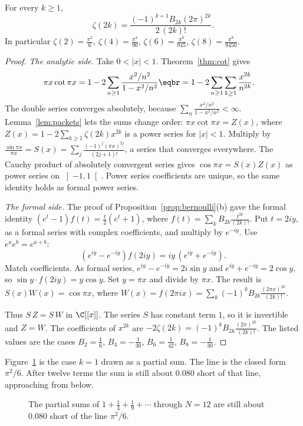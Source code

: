 \begin{theorem}[Euler, 1735--1740]\label{thm:zeta2k}
For every $k\ge1$,
\[
\zeta(2k)=\frac{(-1)^{k+1}B_{2k}(2\pi)^{2k}}{2\,(2k)!}.
\]
In particular $\zeta(2)=\frac{\pi^2}6$, $\zeta(4)=\frac{\pi^4}{90}$, $\zeta(6)=\frac{\pi^6}{945}$, $\zeta(8)=\frac{\pi^8}{9450}$.
\end{theorem}
\begin{proof}
\emph{The analytic side.} Take $0<|x|<1$. Theorem~\ref{thm:cot} gives
\[
\begin{aligned}\pi x\cot\pi x&=1-2\sum_{n\ge1}\frac{x^2/n^2}{1-x^2/n^2}\eqbr=1-2\sum_{n\ge1}\sum_{k\ge1}\frac{x^{2k}}{n^{2k}}.\end{aligned}
\]
The double series converges absolutely, because $\sum_n\frac{x^2/n^2}{1-x^2/n^2}<\infty$. Lemma~\ref{lem:packets} lets the sums change order: $\pi x\cot\pi x=Z(x)$, where $Z(x)=1-2\sum_{k\ge1}\zeta(2k)x^{2k}$ is a power series for $|x|<1$. Multiply by $\frac{\sin\pi x}{\pi x}=S(x)=\sum_j\frac{(-1)^j(\pi x)^{2j}}{(2j+1)!}$, a series that converges everywhere. The Cauchy product of absolutely convergent series gives $\cos\pi x=S(x)Z(x)$ as power series on $\left]-1,1\right[$. Power series coefficients are unique, so the same identity holds as formal power series.

\emph{The formal side.} The proof of Proposition~\ref{prop:bernoulli}(b) gave the formal identity $(e^t-1)f(t)=\frac t2(e^t+1)$, where $f(t)=\sum_kB_{2k}\frac{t^{2k}}{(2k)!}$. Put $t=2iy$, as a formal series with complex coefficients, and multiply by $e^{-iy}$. Use $e^{a}e^{b}=e^{a+b}$:
\[
(e^{iy}-e^{-iy})f(2iy)=iy\,(e^{iy}+e^{-iy}).
\]
Match coefficients. As formal series, $e^{iy}-e^{-iy}=2i\sin y$ and $e^{iy}+e^{-iy}=2\cos y$, so $\sin y\cdot f(2iy)=y\cos y$. Set $y=\pi x$ and divide by $\pi x$. The result is $S(x)W(x)=\cos\pi x$, where $W(x)=f(2\pi ix)=\sum_k(-1)^kB_{2k}\frac{(2\pi x)^{2k}}{(2k)!}$.

Thus $S\,Z=S\,W$ in $\C[[x]]$. The series $S$ has constant term $1$, so it is invertible and $Z=W$. The coefficients of $x^{2k}$ are $-2\zeta(2k)=(-1)^kB_{2k}\frac{(2\pi)^{2k}}{(2k)!}$. The listed values are the cases $B_2=\frac16$, $B_4=-\frac1{30}$, $B_6=\frac1{42}$, $B_8=-\frac1{30}$.
\end{proof}

Figure~\ref{fig:rw03-basel} is the case $k=1$ drawn as a partial sum. The line is the closed form $\pi^2/6$. After twelve terms the sum is still about $0.080$ short of that line, approaching from below.

\begin{figure}[ht]
\centering
{}
\caption{The partial sums of $1+\frac14+\frac19+\cdots$ through $N=12$ are still about $0.080$ short of the line $\pi^2/6$.}
\label{fig:rw03-basel}
\end{figure}

